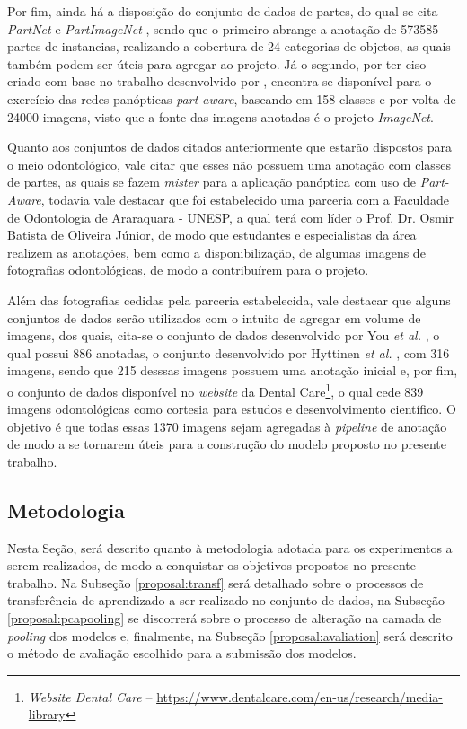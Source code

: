 Por fim, ainda há a disposição do conjunto de dados de partes, do qual se cita \textit{PartNet} \cite{mo2019} e \textit{PartImageNet} \cite{He2021}, sendo que o primeiro abrange a anotação de 573585 partes de instancias, realizando a cobertura de 24 categorias de objetos, as quais também podem ser úteis para agregar ao projeto. Já o segundo, por ter ciso criado com base no trabalho desenvolvido por \cite{DeGeus2021}, encontra-se disponível para o exercício das redes panópticas \textit{part-aware}, baseando em 158 classes e por volta de 24000 imagens, visto que a fonte das imagens anotadas é o projeto \textit{ImageNet}.

Quanto aos conjuntos de dados citados anteriormente que estarão dispostos para o meio odontológico, vale citar que esses não possuem uma anotação com classes de partes, as quais se fazem \textit{mister} para a aplicação panóptica com uso de \textit{Part-Aware}, todavia vale destacar que foi estabelecido uma parceria com a Faculdade de Odontologia de Araraquara - UNESP, a qual terá com líder o Prof. Dr. Osmir Batista de Oliveira Júnior, de modo que estudantes e especialistas da área realizem as anotações, bem como a disponibilização, de algumas imagens de fotografias odontológicas, de modo a contribuírem para o projeto.

Além das fotografias cedidas pela parceria estabelecida, vale destacar que alguns conjuntos de dados serão utilizados com o intuito de agregar em volume de imagens, dos quais, cita-se o conjunto de dados desenvolvido por You \textit{et al.} \cite{You2020}, o qual possui 886 anotadas, o conjunto desenvolvido por Hyttinen \textit{et al.} \cite{Hyttinen2020}, com 316 imagens, sendo que 215 desssas imagens possuem uma anotação inicial e, por fim, o conjunto de dados disponível no \textit{website} da Dental Care\footnote{\textit{Website Dental Care} – \url{https://www.dentalcare.com/en-us/research/media-library}}, o qual cede 839 imagens odontológicas como cortesia para estudos e desenvolvimento científico. O objetivo é que todas essas 1370 imagens sejam agregadas à \textit{pipeline} de anotação de modo a se tornarem úteis para a construção do modelo proposto no presente trabalho.

\subsection{Metodologia}
\label{proposal:methodology}
Nesta Seção, será descrito quanto à metodologia adotada para os experimentos a serem realizados, de modo a conquistar os objetivos propostos no presente trabalho. Na Subseção \ref{proposal:transf} será detalhado sobre o processos de transferência de aprendizado a ser realizado no conjunto de dados, na Subseção \ref{proposal:pcapooling} se discorrerá sobre o processo de alteração na camada de \textit{pooling} dos modelos e, finalmente, na Subseção \ref{proposal:avaliation} será descrito o método de avaliação escolhido para a submissão dos modelos.

